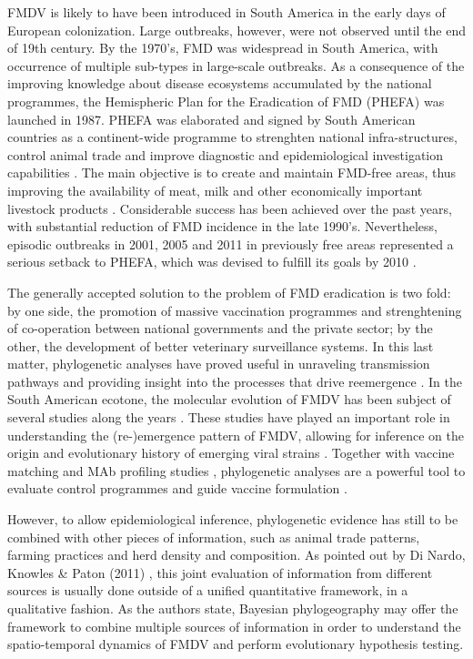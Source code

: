 \documentclass[10pt]{article}
\begin{document}
FMDV is likely to have been introduced in South America in the early days of European colonization. Large outbreaks, however, were not observed until the end of 19th century. By the 1970's, FMD was widespread in South America, with occurrence of multiple sub-types \cite{Saraiva2003} in large-scale outbreaks. As a consequence of the improving knowledge about disease ecosystems accumulated by the national programmes, the Hemispheric Plan for the Eradication of FMD (PHEFA) was launched in 1987. PHEFA was elaborated and signed by South American countries as a continent-wide programme to strenghten national infra-structures, control animal trade and improve diagnostic and epidemiological investigation capabilities \cite{review_eradication}. The main objective is to create and maintain FMD-free areas, thus improving the availability of meat, milk and other economically important livestock products \cite{Saraiva2003,Saraiva2004,review_eradication,combining}. Considerable success has been achieved over the 
past years, with substantial reduction of FMD incidence in the late 1990's. Nevertheless, episodic outbreaks in 2001, 2005 and 2011 in previously free areas represented a serious setback to PHEFA, which was devised to fulfill its goals by 2010 \cite{Saraiva2003,Saraiva2004}.

The generally accepted solution to the problem of FMD eradication is two fold: by one side, the promotion of massive vaccination programmes \cite{vaccinationSA} and strenghtening of co-operation between national governments and the private sector; by the other, the development of better veterinary surveillance systems. In this last matter, phylogenetic analyses have proved useful in unraveling transmission pathways \cite{cottam2008} and providing insight into the processes that drive reemergence \cite{combining}. In the South American ecotone, the molecular evolution of FMDV has been subject of several studies along the years \cite{Perez2001,Malirat2007,andean,Malirat2011,Maradei2013}. These studies have played an important role in understanding the (re-)emergence pattern of FMDV, allowing for inference on the origin and evolutionary history of emerging viral strains \cite{topotypes,Perez2001}. Together with vaccine matching and MAb profiling studies \cite{Maradei2011}, phylogenetic analyses are a powerful 
tool to evaluate control programmes and guide vaccine formulation \cite{Maradei2011,Maradei2013}.

However, to allow epidemiological inference, phylogenetic evidence has still to be combined with other pieces of information, such as animal trade patterns, farming practices and herd density and composition. As pointed out by Di Nardo, Knowles \&  Paton (2011) \cite{combining}, this joint evaluation of information from different sources is usually done outside of a unified quantitative framework, in a qualitative fashion. As the authors state, Bayesian phylogeography may offer the framework to combine multiple sources of information in order to understand the spatio-temporal dynamics of FMDV and perform evolutionary hypothesis testing.
\end{document}

